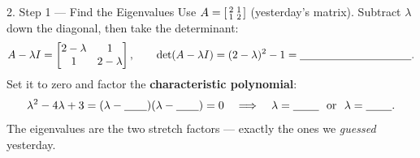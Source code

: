 \documentclass[10pt]{article}
\begin{document}
\begin{notesbox}{2. Step 1 --- Find the Eigenvalues}
Use $A=\begin{bsmallmatrix} 2 & 1\\ 1 & 2 \end{bsmallmatrix}$ (yesterday's matrix). Subtract
$\lambda$ down the diagonal, then take the determinant:
\[
  A-\lambda I=\begin{bmatrix} 2-\lambda & 1\\ 1 & 2-\lambda \end{bmatrix},\qquad
  \det(A-\lambda I)=(2-\lambda)^2-1=\blank{3.6cm}.
\]
Set it to zero and factor the \textbf{characteristic polynomial}:
\[
  \lambda^2-4\lambda+3=(\lambda-\blank{0.7cm})(\lambda-\blank{0.7cm})=0
  \quad\Longrightarrow\quad \lambda=\blank{0.8cm}\ \text{ or }\ \lambda=\blank{0.8cm}.
\]
The eigenvalues are the two stretch factors --- exactly the ones we \emph{guessed} yesterday.
\end{notesbox}
\end{document}
